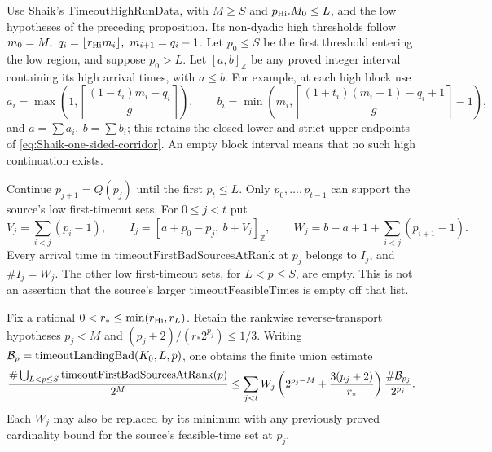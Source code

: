 \begin{proposition}
\label{prop:Shaik-low-timeout-support}
Use Shaik's \(\mathrm{TimeoutHighRunData}\), with
\(M\ge S\) and \(p_{\rm Hi}.M_0\le L\), and the low hypotheses
of the preceding proposition.
Its non-dyadic high thresholds follow
\(m_0=M,\ q_i=\lfloor r_{\rm Hi}m_i\rfloor,\ m_{i+1}=q_i-1\).
Let \(p_0\le S\) be the first threshold entering the low region,
and suppose \(p_0>L\). Let \([a,b]_{\mathbb Z}\) be any proved
integer interval containing its high arrival times, with \(a\le b\).
For example, at each high block use
\[
 a_i=\max\!\left(1,\left\lceil
          \frac{(1-t_i)m_i-q_i}{g}\right\rceil\right),\qquad
 b_i=\min\!\left(m_i,\left\lceil
          \frac{(1+t_i)(m_i+1)-q_i+1}{g}\right\rceil-1\right),
\]
and \(a=\sum a_i,\ b=\sum b_i\); this retains the closed lower
and strict upper endpoints of \eqref{eq:Shaik-one-sided-corridor}.
An empty block interval means that no such high continuation exists.

Continue \(p_{j+1}=Q(p_j)\) until the first \(p_t\le L\).
Only \(p_0,\ldots,p_{t-1}\) can support the source's low first-timeout
sets. For \(0\le j<t\) put
\[
 V_j=\sum_{i<j}(p_i-1),\qquad
 I_j=[a+p_0-p_j,\ b+V_j]_{\mathbb Z},\qquad
 W_j=b-a+1+\sum_{i<j}(p_{i+1}-1).
\]
Every arrival time in \(\mathrm{timeoutFirstBadSourcesAtRank}\)
at \(p_j\) belongs to \(I_j\), and \(\#I_j=W_j\).
The other low first-timeout sets, for \(L<p\le S\), are empty.
This is not an assertion that the source's larger
\(\mathrm{timeoutFeasibleTimes}\) is empty off that list.

Fix a rational \(0<r_*\le\min(r_{\rm Hi},r_L)\). Retain the
rankwise reverse-transport hypotheses
\(p_j<M\) and \((p_j+2)/(r_*2^{p_j})\le1/3\).
Writing \({\cal B}_{p}=\mathrm{timeoutLandingBad}(K_0,L,p)\), one obtains
the finite union estimate
\begin{equation}\label{eq:Shaik-low-refined-count}
 \frac{\#\bigcup_{L<p\le S}\mathrm{timeoutFirstBadSourcesAtRank}(p)}
      {2^M}
 \le
 \sum_{j<t}W_j
       \left(2^{p_j-M}+\frac{3(p_j+2)}{r_*}\right)
       \frac{\#{\cal B}_{p_j}}{2^{p_j}} .
\end{equation}
Each \(W_j\) may also be replaced by its minimum with any previously
proved cardinality bound for the source's feasible-time set at \(p_j\).
\end{proposition}
